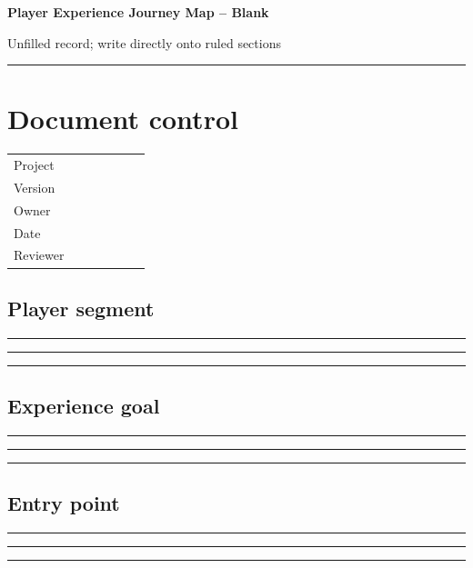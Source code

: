 \documentclass[11pt]{article}
\begin{document}
{\huge\bfseries\color{suiteblue} Player Experience Journey Map -- Blank}\par
\vspace{0.15in}
{\normalsize\color{suitegray} Unfilled record; write directly onto ruled sections}\par
\vspace{0.15in}\hrule\vspace{0.15in}

\section{Document control}
\renewcommand{\arraystretch}{1.8}
\begin{tabularx}{\linewidth}{@{}p{0.30\linewidth}X@{}}\toprule
Project & \hrulefill\\ Version & \hrulefill\\ Owner & \hrulefill\\ Date & \hrulefill\\ Reviewer & \hrulefill\\ \bottomrule\end{tabularx}

\subsection{Player segment}
\noindent\rule{\linewidth}{0.3pt}\par\vspace{0.18in}
\noindent\rule{\linewidth}{0.3pt}\par\vspace{0.18in}
\noindent\rule{\linewidth}{0.3pt}\par\vspace{0.14in}

\subsection{Experience goal}
\noindent\rule{\linewidth}{0.3pt}\par\vspace{0.18in}
\noindent\rule{\linewidth}{0.3pt}\par\vspace{0.18in}
\noindent\rule{\linewidth}{0.3pt}\par\vspace{0.14in}

\subsection{Entry point}
\noindent\rule{\linewidth}{0.3pt}\par\vspace{0.18in}
\noindent\rule{\linewidth}{0.3pt}\par\vspace{0.18in}
\noindent\rule{\linewidth}{0.3pt}\par\vspace{0.14in}
\end{document}
